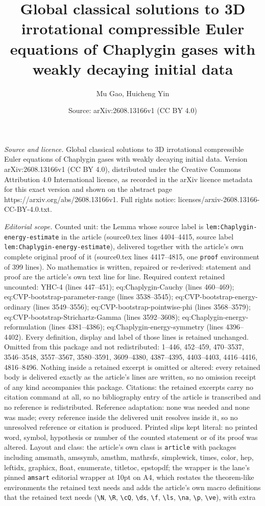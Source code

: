 \documentclass[10pt,a4paper]{amsart}
\title[Global classical solutions to 3D irrotational compressible E]{Global classical solutions to 3D irrotational compressible Euler equations of Chaplygin gases with weakly decaying initial data}
\author{Mu Gao, Huicheng Yin}
\date{Source: arXiv:2608.13166v1 (CC BY 4.0)}
\begin{document}
\maketitle

\noindent\emph{Source and licence.} Global classical solutions to 3D irrotational compressible Euler equations of Chaplygin gases with weakly decaying initial data. Version arXiv:2608.13166v1 (CC BY 4.0), distributed under the Creative Commons Attribution 4.0 International licence, as recorded in the arXiv licence metadata for this exact version and shown on the abstract page https://arxiv.org/abs/2608.13166v1. Full rights notice: licenses/arxiv-2608.13166-CC-BY-4.0.txt.\par\smallskip

\noindent\textit{Editorial scope.} Counted unit: the Lemma whose source label is \texttt{lem:Chaplygin-energy-estimate} in the article (source0.tex lines 4404--4415, source label \texttt{lem:Chaplygin-energy-estimate}), delivered together with the article's own complete original proof of it (source0.tex lines 4417--4815, one \texttt{proof} environment of 399 lines). No mathematics is written, repaired or re-derived: statement and proof are the article's own text line for line. Required context retained uncounted: YHC-4 (lines 447--451); eq:Chaplygin-Cauchy (lines 460--469); eq:CVP-bootstrap-parameter-range (lines 3538--3545); eq:CVP-bootstrap-energy-ordinary (lines 3549--3556); eq:CVP-bootstrap-pointwise-phi (lines 3568--3579); eq:CVP-bootstrap-Strichartz-Gamma (lines 3592--3608); eq:Chaplygin-energy-reformulation (lines 4381--4386); eq:Chaplygin-energy-symmetry (lines 4396--4402). Every definition, display and label of those lines is retained unchanged. Omitted from this package and not redistributed: 1--446, 452--459, 470--3537, 3546--3548, 3557--3567, 3580--3591, 3609--4380, 4387--4395, 4403--4403, 4416--4416, 4816--8496. Nothing inside a retained excerpt is omitted or altered: every retained body is delivered exactly as the article's lines are written, so no omission receipt of any kind accompanies this package. Citations: the retained excerpts carry no citation command at all, so no bibliography entry of the article is transcribed and no reference is redistributed. Reference adaptation: none was needed and none was made; every reference inside the delivered unit resolves inside it, so no unresolved reference or citation is produced. Printed slips kept literal: no printed word, symbol, hypothesis or number of the counted statement or of its proof was altered. Layout and class: the article's own class is \texttt{article} with packages including amsmath, amssymb, amsthm, mathrsfs, simplewick, times, color, hep, leftidx, graphicx, float, enumerate, titletoc, epstopdf; the wrapper is the lane's pinned \texttt{amsart} editorial wrapper at 10pt on A4, which restates the theorem-like environments the retained text needs and adds the article's own macro definitions that the retained text needs (\texttt{\textbackslash N}, \texttt{\textbackslash R}, \texttt{\textbackslash cQ}, \texttt{\textbackslash ds}, \texttt{\textbackslash f}, \texttt{\textbackslash ls}, \texttt{\textbackslash na}, \texttt{\textbackslash p}, \texttt{\textbackslash ve}), with extra 
\end{document}
